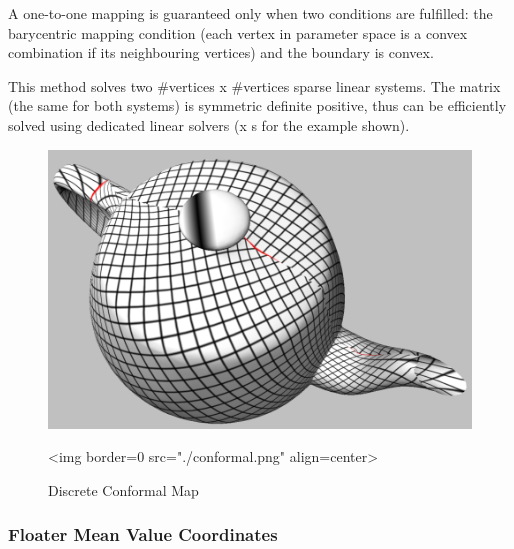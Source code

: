 A one-to-one mapping is guaranteed only when two conditions are
fulfilled: the barycentric mapping condition (each vertex in parameter
space is a convex combination if its neighbouring vertices) and the
boundary is convex.


This method solves two \#vertices x \#vertices sparse linear
systems. The matrix (the same for both systems) is symmetric definite
positive, thus can be efficiently solved using dedicated linear
solvers (x s for the example shown).

\begin{figure}[bht]
    \begin{center}
        \begin{ccTexOnly}
            \includegraphics{Parameterization/conformal} %
        \end{ccTexOnly}
        \begin{ccHtmlOnly}
            <img border=0 src="./conformal.png" align=center>
        \end{ccHtmlOnly}
        \label{parameterization-fig-conformal}

        \caption{Discrete Conformal Map}
    \end{center}
\end{figure}


\subsubsection{Floater Mean Value Coordinates}

